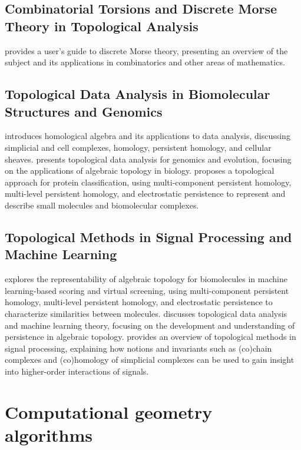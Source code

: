 \documentclass{article}
\begin{document}
\subsection{Combinatorial Torsions and Discrete Morse Theory in Topological Analysis}

\cite{Forman2002AUG} provides a user's guide to discrete Morse theory, presenting an overview of the subject and its applications in combinatorics and other areas of mathematics.

\subsection{Topological Data Analysis in Biomolecular Structures and Genomics}

\cite{Ghrist2018HomologicalAA} introduces homological algebra and its applications to data analysis, discussing simplicial and cell complexes, homology, persistent homology, and cellular sheaves. \cite{Rabadan2020TopologicalDA} presents topological data analysis for genomics and evolution, focusing on the applications of algebraic topology in biology. \cite{Cang2015ATA} proposes a topological approach for protein classification, using multi-component persistent homology, multi-level persistent homology, and electrostatic persistence to represent and describe small molecules and biomolecular complexes.

\subsection{Topological Methods in Signal Processing and Machine Learning}

\cite{Cang2017RepresentabilityOA} explores the representability of algebraic topology for biomolecules in machine learning-based scoring and virtual screening, using multi-component persistent homology, multi-level persistent homology, and electrostatic persistence to characterize similarities between molecules. \cite{Carlsson2012TopologicalDA} discusses topological data analysis and machine learning theory, focusing on the development and understanding of persistence in algebraic topology. \cite{Voli2020TopologicalMI} provides an overview of topological methods in signal processing, explaining how notions and invariants such as (co)chain complexes and (co)homology of simplicial complexes can be used to gain insight into higher-order interactions of signals.


\section{Computational geometry algorithms}
\end{document}

